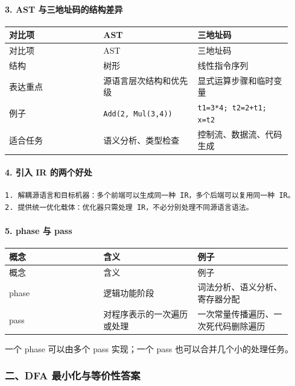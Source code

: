 \documentclass[UTF8]{ctexart}
\begin{document}
\paragraph*{3. AST 与三地址码的结构差异}

\begin{longtable}{|p{0.31\linewidth}|p{0.31\linewidth}|p{0.31\linewidth}|}
\hline
对比项 & AST & 三地址码 \\
\hline
\endfirsthead
对比项 & AST & 三地址码 \\
\hline
\endhead
结构 & 树形 & 线性指令序列 \\
\hline
表达重点 & 源语言层次结构和优先级 & 显式运算步骤和临时变量 \\
\hline
例子 & \texttt{Add(2, Mul(3,4))} & \texttt{t1=3*4; t2=2+t1; x=t2} \\
\hline
适合任务 & 语义分析、类型检查 & 控制流、数据流、代码生成 \\
\hline
\end{longtable}

\paragraph*{4. 引入 IR 的两个好处}

\begin{Verbatim}[fontsize=\small,breaklines=true]
1. 解耦源语言和目标机器：多个前端可以生成同一种 IR，多个后端可以复用同一种 IR。
2. 提供统一优化载体：优化器只需处理 IR，不必分别处理不同源语言语法。
\end{Verbatim}

\paragraph*{5. phase 与 pass}

\begin{longtable}{|p{0.31\linewidth}|p{0.31\linewidth}|p{0.31\linewidth}|}
\hline
概念 & 含义 & 例子 \\
\hline
\endfirsthead
概念 & 含义 & 例子 \\
\hline
\endhead
phase & 逻辑功能阶段 & 词法分析、语义分析、寄存器分配 \\
\hline
pass & 对程序表示的一次遍历或处理 & 一次常量传播遍历、一次死代码删除遍历 \\
\hline
\end{longtable}

一个 phase 可以由多个 pass 实现；一个 pass 也可以合并几个小的处理任务。

\subsubsection*{二、DFA 最小化与等价性答案}
\end{document}
